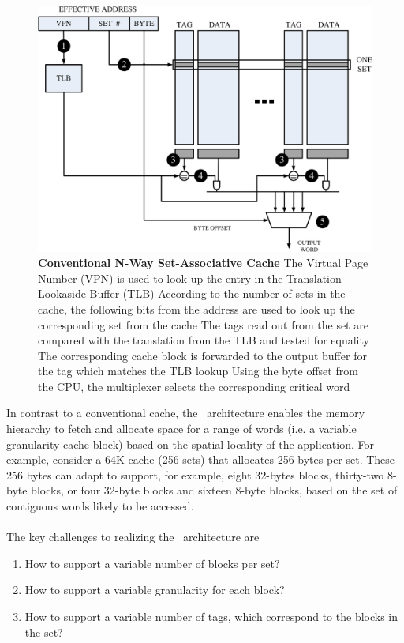 \begin{figure}[b]
  \begin{center}
    \includegraphics[width=\textwidth]{files/Figures/06-NWaySetAssocCache.pdf}
    \caption[Conventional N-Way Set-Associative Cache]{\textbf{Conventional N-Way Set-Associative Cache}  The Virtual Page Number (VPN) is used to look up the entry in the Translation Lookaside Buffer (TLB)  According to the number of sets in the cache, the following bits from the address are used to look up the corresponding set from the cache  The tags read out from the set are compared with the translation from the TLB and tested for equality  The corresponding cache block is forwarded to the output buffer for the tag which matches the TLB lookup  Using the byte offset from the CPU, the multiplexer selects the corresponding critical word }
    \label{fig:set_assoc_arch}
  \end{center}
\end{figure}

\clearpage

In contrast to a conventional cache, the \AC\ architecture enables the memory hierarchy to fetch and allocate space for a range of words (i.e. a variable granularity cache block) based on the spatial locality of the application. For example, consider a 64K cache (256 sets) that allocates 256 bytes per set. These 256 bytes can adapt to support, for example, eight 32-bytes blocks, thirty-two 8-byte blocks, or four 32-byte blocks and sixteen 8-byte blocks, based on the set of contiguous words likely to be accessed. 
\\ \\
The key challenges to realizing the \AC\ architecture are
\begin{enumerate}[noitemsep]
	\item How to support a variable number of blocks per set?
	\item How to support a variable granularity for each block?
	\item How to support a variable number of tags, which correspond to the blocks in the set?
\end{enumerate}

